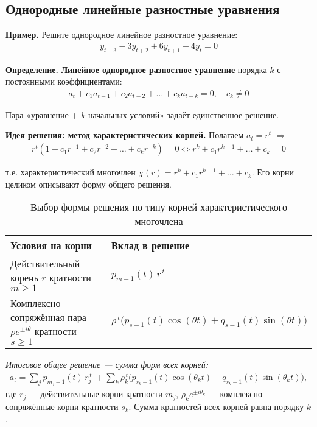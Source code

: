 \subsection{Однородные линейные разностные уравнения}\label{sec:homogeneous}

\textbf{Пример.} Решите однородное линейное разностное уравнение:
\begin{align}
y_{t+3} - 3y_{t+2} + 6y_{t+1} - 4y_t = 0
\end{align}

\textbf{Определение.} \textbf{Линейное однородное разностное уравнение} порядка $k$ с постоянными коэффициентами:
\begin{align}
a_t + c_1 a_{t-1} + c_2 a_{t-2} + \dots + c_k a_{t-k} = 0, \quad c_k \neq 0
\end{align}

Пара «уравнение + $k$ начальных условий» задаёт единственное решение.

\textbf{Идея решения: метод характеристических корней.} Полагаем $a_t = r^t$ $\Rightarrow$
\begin{align}
r^t (1 + c_1 r^{-1} + c_2 r^{-2} + \dots + c_k r^{-k}) = 0 \iff r^k + c_1 r^{k-1} + \dots + c_k = 0
\end{align}

т.е. характеристический многочлен $\chi(r) = r^k + c_1 r^{k-1} + \dots + c_k$. Его корни целиком описывают форму общего решения.

\begin{NotationSection}
\end{NotationSection}

\begin{table}[h!]
\centering
\caption{Выбор формы решения по типу корней характеристического многочлена}
\begin{tabular}{|l|l|}
\hline
\textbf{Условия на корни} & \textbf{Вклад в решение} \\
\hline
Действительный корень $r$ кратности $m\ge 1$ &
$p_{m-1}(t)\, r^{\,t}$ \\
\hline
Комплексно-сопряжённая пара $\rho e^{\pm i\theta}$ кратности $s\ge 1$ &
$\rho^{\,t}\big(p_{s-1}(t)\cos(\theta t)+q_{s-1}(t)\sin(\theta t)\big)$ \\
\hline
\end{tabular}

\vspace{0.5em}
\emph{Итоговое общее решение — сумма форм всех корней:}
\begin{align*}
a_t = \sum_{j} p_{m_j-1}(t)\, r_j^{\,t}
\; + \sum_{k} \rho_k^{\,t}\big(p_{s_k-1}(t)\cos(\theta_k t)+q_{s_k-1}(t)\sin(\theta_k t)\big),
\end{align*}
где $r_j$ — действительные корни кратности $m_j$, $\rho_k e^{\pm i\theta_k}$ — комплексно-сопряжённые корни кратности $s_k$.
Сумма кратностей всех корней равна порядку $k$.
\end{table}


